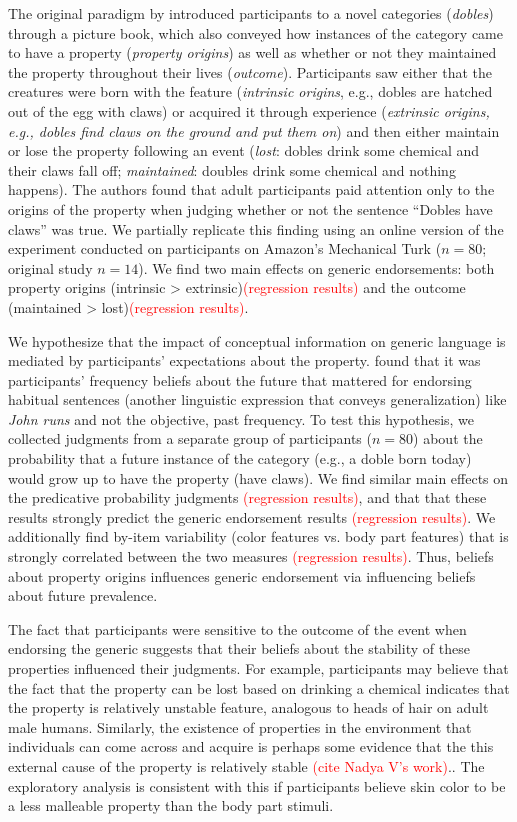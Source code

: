 \documentclass[floatsintext, 11pt, doc]{apa6}
\newcommand{\red}[1]{\textcolor{Red}{#1}}
\begin{document}
The original paradigm by  introduced participants to a novel categories (\emph{dobles}) through a picture book, which also conveyed how instances of the category came to have a property (\emph{property origins}) as well as whether or not they maintained the property throughout their lives (\emph{outcome}).
Participants saw either that the creatures were born with the feature (\emph{intrinsic origins}, e.g., dobles are hatched out of the egg with claws) or acquired it through experience (\emph{extrinsic origins, e.g., dobles find claws on the ground and put them on}) and then either maintain or lose the property following an event (\emph{lost}: dobles drink some chemical and their claws fall off; \emph{maintained}: doubles drink some chemical and nothing happens). 
The authors found that adult participants paid attention only to the origins of the property when judging whether or not the sentence ``Dobles have claws'' was true.
We partially replicate this finding using an online version of the experiment conducted on participants on Amazon's Mechanical Turk ($n=80$; original study $n=14$). 
We find two main effects on generic endorsements: both property origins (intrinsic > extrinsic)\red{(regression results)} and the outcome (maintained > lost)\red{(regression results)}. 

We hypothesize that the impact of conceptual information on generic language is mediated by participants' expectations about the property.  found that it was participants' frequency beliefs about the future that mattered for endorsing habitual sentences (another linguistic expression that conveys generalization) like \emph{John runs} and not the objective, past frequency. 
To test this hypothesis, we collected judgments from a separate group of participants ($n = 80$) about the probability that a future instance of the category (e.g., a doble born today) would grow up to have the property (have claws).
We find similar main effects on the predicative probability judgments \red{(regression results)}, and that that these results strongly predict the generic endorsement results \red{(regression results)}.
We additionally find by-item variability (color features vs. body part features) that is strongly correlated between the two measures  \red{(regression results)}. 
Thus, beliefs about property origins influences generic endorsement via influencing beliefs about future prevalence. 

The fact that participants were sensitive to the outcome of the event when endorsing the generic suggests that their beliefs about the stability of these properties influenced their judgments.
For example, participants may believe that the fact that the property can be lost based on drinking a chemical indicates that the property is relatively unstable feature, analogous to heads of hair on adult male humans.
Similarly, the existence of properties in the environment that individuals can come across and acquire is perhaps some evidence that the this external cause of the property is relatively stable \red{(cite Nadya V's work)}.. 
The exploratory analysis is consistent with this if participants believe skin color to be a less malleable property than the body part stimuli.
\end{document}
